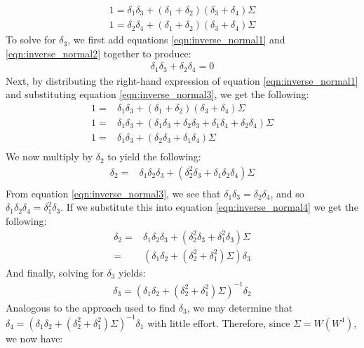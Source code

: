 \begin{align} \label{eqn:inverse_normal1}
1 = \delta_1\delta_3 + (\delta_1 + \delta_2)(\delta_3 + \delta_4)\Sigma
\end{align}
\begin{align} \label{eqn:inverse_normal2}
1 = \delta_2\delta_4 + (\delta_1 + \delta_2)(\delta_3 + \delta_4)\Sigma
\end{align}
To solve for $\delta_3$, we first add equations \ref{eqn:inverse_normal1} and \ref{eqn:inverse_normal2} together to produce:
\begin{align} \label{eqn:inverse_normal3}
\delta_1\delta_3 + \delta_2\delta_4 = 0
\end{align}
Next, by distributing the right-hand expression of equation \ref{eqn:inverse_normal1} and substituting equation \ref{eqn:inverse_normal3}, we get the following:
\begin{align*}
1 = & \delta_1\delta_3 + (\delta_1 + \delta_2)(\delta_3 + \delta_4)\Sigma \\
1 = & \delta_1\delta_3 + (\delta_1\delta_3 + \delta_2\delta_3 + \delta_1\delta_4 + \delta_2\delta_4)\Sigma \\
1 = & \delta_1\delta_3 + (\delta_2\delta_3 + \delta_1\delta_4)\Sigma \\
\end{align*}
We now multiply by $\delta_2$ to yield the following:
\begin{align} \label{eqn:inverse_normal4}
\delta_2 = & \delta_1\delta_2\delta_3 + (\delta_2^2\delta_3 + \delta_1\delta_2\delta_4)\Sigma \\
\end{align}
From equation \ref{eqn:inverse_normal3}, we see that $\delta_1\delta_3 = \delta_2\delta_4$, and so $\delta_1\delta_2\delta_4 = \delta_1^2\delta_3$. If we substitute this into equation \ref{eqn:inverse_normal4} we get the following:
\begin{align*}
\delta_2 = & \delta_1\delta_2\delta_3 + (\delta_2^2\delta_3 + \delta_1^2\delta_3)\Sigma \\
= & (\delta_1\delta_2 + (\delta_2^2 + \delta_1^2)\Sigma)\delta_3
\end{align*}
And finally, solving for $\delta_3$ yields:
\begin{align*}
\delta_3 = (\delta_1\delta_2 + (\delta_2^2 + \delta_1^2)\Sigma)^{-1}\delta_2
\end{align*}
Analogous to the approach used to find $\delta_3$, we may determine that $\delta_4 = (\delta_1\delta_2 + (\delta_2^2 + \delta_1^2)\Sigma)^{-1}\delta_1$ with little effort. Therefore, since $\Sigma = W(W^4)$, we now have:
